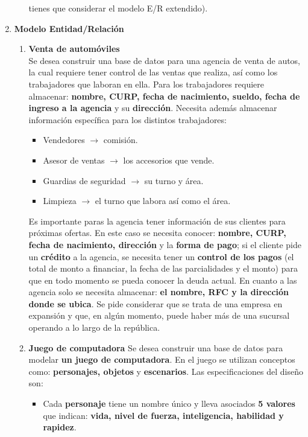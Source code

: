 \documentclass{article}
\begin{document}
\begin{enumerate}
\begin{enumerate}
				tienes que considerar el modelo E/R extendido).
			\end{enumerate}
		\item \textbf{Modelo Entidad/Relación}
			\begin{enumerate}
				\item \textbf{Venta de automóviles}
				\\Se desea construir una base de datos para una agencia de venta de autos, la cual requiere tener control de las ventas que realiza, así como los trabajadores que laboran en ella.
				Para los trabajadores requiere almacenar: \textbf{nombre, CURP, fecha de nacimiento, sueldo, fecha de ingreso a la agencia} y su \textbf{dirección}. Necesita además almacenar información específica para los distintos trabajadores:		
				\begin{itemize}
					\item Vendedores $\rightarrow$ comisión.
					\item Asesor de ventas $\rightarrow$ los accesorios que vende.
					\item Guardias de seguridad $\rightarrow$ su turno y área.
					\item Limpieza $\rightarrow$ el turno que labora así como el área.
				\end{itemize}		
			Es importante paras la agencia tener información de sus clientes para próximas ofertas. En este
			caso se necesita conocer: \textbf{nombre, CURP, fecha de nacimiento, dirección} y la \textbf{forma de pago}; si el
			cliente pide un \textbf{crédito} a la agencia, se necesita tener un \textbf{control de los pagos} (el total de monto
			a financiar, la fecha de las parcialidades y el monto) para que en todo momento se pueda
			conocer la deuda actual. En cuanto a las agencia solo se necesita almacenar: \textbf{el nombre, RFC y
			la dirección donde se ubica}. Se pide considerar que se trata de una empresa en expansión y que,
			en algún momento, puede haber más de una sucursal operando a lo largo de la república.
			\item \textbf{Juego de computadora}
			Se desea construir una base de datos para modelar \textbf{un juego de
			computadora}. En el juego se utilizan conceptos como: \textbf{personajes,
			objetos} y \textbf{escenarios}. Las especificaciones del diseño son:
				\begin{itemize}
					\item Cada \textbf{personaje} tiene un nombre único y lleva asociados \textbf{5 valores}
					que indican: \textbf{vida, nivel de fuerza, inteligencia, habilidad y rapidez}.

\end{itemize}
\end{enumerate}
\end{enumerate}
\end{document}

